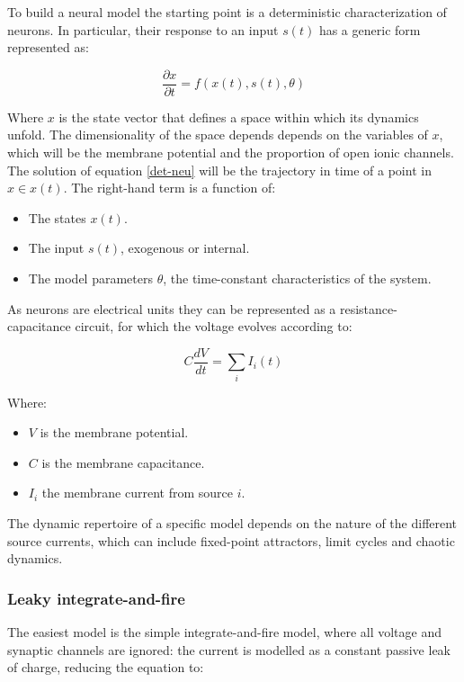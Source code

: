 	To build a neural model the starting point is a deterministic characterization of neurons.
	In particular, their response to an input $s(t)$ has a generic form represented as:

	\begin{equation}
		\frac{\partial x}{\partial t} = f(x(t), s(t), \theta)
		\label{det-neu}
	\end{equation}

	Where $x$ is the state vector that defines a space within which its dynamics unfold.
	The dimensionality of the space depends depends on the variables of $x$, which will be the membrane potential and the proportion of open ionic channels.
	The solution of equation \ref{det-neu} will be the trajectory in time of a point in $x\in x(t)$.
	The right-hand term is a function of:

	\begin{itemize}
		\item The states $x(t)$.
		\item The input $s(t)$, exogenous or internal.
		\item The model parameters $\theta$, the time-constant characteristics of the system.
	\end{itemize}

	As neurons are electrical units they can be represented as a resistance-capacitance circuit, for which the voltage evolves according to:

	$$C\frac{dV}{dt} = \sum\limits_i I_i(t)$$

	Where:

	\begin{itemize}
		\item $V$ is the membrane potential.
		\item $C$ is the membrane capacitance.
		\item $I_i$ the membrane current from source $i$.
	\end{itemize}

	The dynamic repertoire of a specific model depends on the nature of the different source currents, which can include fixed-point attractors, limit cycles and chaotic dynamics.

		\subsubsection{Leaky integrate-and-fire}
		The easiest model is the simple integrate-and-fire model, where all voltage and synaptic channels are ignored: the current is modelled as a constant passive leak of charge, reducing the equation to:

